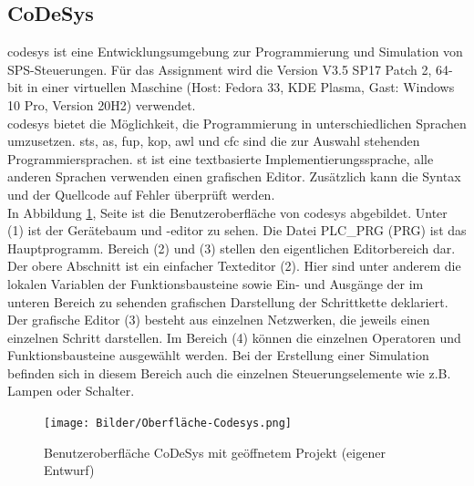 \subsection{CoDeSys}
 \ac{codesys} ist eine Entwicklungsumgebung zur Programmierung und Simulation von SPS-Steuerungen.\autocite[vgl.][1]{CODESYS2004} Für das Assignment wird die Version V3.5 SP17 Patch 2, 64-bit in einer virtuellen Maschine (Host: Fedora 33, KDE Plasma, Gast: Windows 10 Pro, Version 20H2) verwendet.\\
\ac{codesys} bietet die Möglichkeit, die Programmierung in unterschiedlichen Sprachen umzusetzen. \acp{st}, \ac{as}, \ac{fup}, \ac{kop}, \ac{awl} und \ac{cfc} sind die zur Auswahl stehenden Programmiersprachen. \ac{st} ist eine textbasierte Implementierungssprache, alle anderen Sprachen verwenden einen grafischen Editor. Zusätzlich kann die Syntax und der Quellcode auf Fehler überprüft werden. \autocite[vgl.][Kapitel \glqq Programmiersprachen und ihre Editoren\grqq{} und \glqq Befehl 'Code erzeugen'\grqq{}]{manCODESYS}\\
In Abbildung \ref{fig:Oberfl_Codesys}, Seite \pageref{fig:Oberfl_Codesys} ist die Benutzeroberfläche von \ac{codesys} abgebildet. Unter (1) ist der Gerätebaum und -editor zu sehen. Die Datei \glqq PLC\_PRG (PRG)\grqq{} ist das Hauptprogramm. Bereich (2) und (3) stellen den eigentlichen Editorbereich dar. Der obere Abschnitt ist ein einfacher Texteditor (2). Hier sind unter anderem die lokalen Variablen der Funktionsbausteine sowie Ein- und Ausgänge der im unteren Bereich zu sehenden grafischen Darstellung der Schrittkette deklariert. Der grafische Editor (3) besteht aus einzelnen Netzwerken, die jeweils einen einzelnen Schritt darstellen. Im Bereich (4) können die einzelnen Operatoren und Funktionsbausteine ausgewählt werden. Bei der Erstellung einer Simulation befinden sich in diesem Bereich auch die einzelnen Steuerungselemente wie z.B. Lampen oder Schalter. \autocite[vgl.][Kapitel \glqq Ihr erstes CODESYS-Programm\grqq{} sowie \glqq Gerätebaum und Geräteeditor\grqq{}]{manCODESYS}
\begin{figure}[H]
   \centering
    \texttt{[image: Bilder/Oberfläche-Codesys.png]}
    \caption[Benutzeroberfläche CoDeSys]{Benutzeroberfläche CoDeSys mit geöffnetem Projekt (eigener Entwurf)}
    \label{fig:Oberfl_Codesys}
\end{figure}
